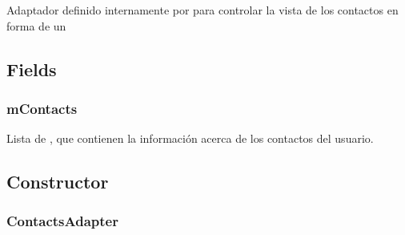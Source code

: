 \documentclass[letterpaper,10pt,english]{sphinxmanual}
\begin{document}
\begin{fulllineitems}
\label{Adapter/ContactsAdapter:com.fiuba.tallerii.jobify.ContactsAdapter}
Adaptador definido internamente por  para controlar la vista de los contactos en forma de un 

\end{fulllineitems}



\subsection{Fields}
\label{Adapter/ContactsAdapter:fields}

\subsubsection{mContacts}
\label{Adapter/ContactsAdapter:mcontacts}

\begin{fulllineitems}
\label{Adapter/ContactsAdapter:com.fiuba.tallerii.jobify.ContactsAdapter.mContacts}
Lista de , que contienen la información acerca de los contactos del usuario.

\end{fulllineitems}



\subsection{Constructor}
\label{Adapter/ContactsAdapter:constructor}

\subsubsection{ContactsAdapter}
\label{Adapter/ContactsAdapter:id1}
\end{document}

